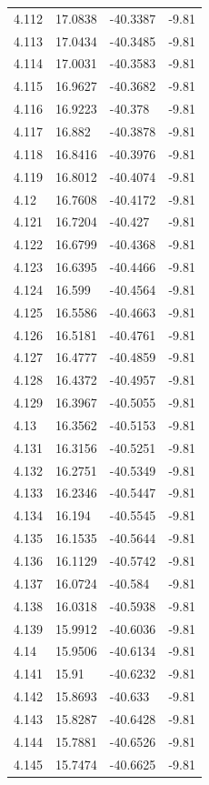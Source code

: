 \begin{tabular}{llll}
4.112 & 17.0838 & -40.3387 & -9.81 \\
4.113 & 17.0434 & -40.3485 & -9.81 \\
4.114 & 17.0031 & -40.3583 & -9.81 \\
4.115 & 16.9627 & -40.3682 & -9.81 \\
4.116 & 16.9223 & -40.378 & -9.81 \\
4.117 & 16.882 & -40.3878 & -9.81 \\
4.118 & 16.8416 & -40.3976 & -9.81 \\
4.119 & 16.8012 & -40.4074 & -9.81 \\
4.12 & 16.7608 & -40.4172 & -9.81 \\
4.121 & 16.7204 & -40.427 & -9.81 \\
4.122 & 16.6799 & -40.4368 & -9.81 \\
4.123 & 16.6395 & -40.4466 & -9.81 \\
4.124 & 16.599 & -40.4564 & -9.81 \\
4.125 & 16.5586 & -40.4663 & -9.81 \\
4.126 & 16.5181 & -40.4761 & -9.81 \\
4.127 & 16.4777 & -40.4859 & -9.81 \\
4.128 & 16.4372 & -40.4957 & -9.81 \\
4.129 & 16.3967 & -40.5055 & -9.81 \\
4.13 & 16.3562 & -40.5153 & -9.81 \\
4.131 & 16.3156 & -40.5251 & -9.81 \\
4.132 & 16.2751 & -40.5349 & -9.81 \\
4.133 & 16.2346 & -40.5447 & -9.81 \\
4.134 & 16.194 & -40.5545 & -9.81 \\
4.135 & 16.1535 & -40.5644 & -9.81 \\
4.136 & 16.1129 & -40.5742 & -9.81 \\
4.137 & 16.0724 & -40.584 & -9.81 \\
4.138 & 16.0318 & -40.5938 & -9.81 \\
4.139 & 15.9912 & -40.6036 & -9.81 \\
4.14 & 15.9506 & -40.6134 & -9.81 \\
4.141 & 15.91 & -40.6232 & -9.81 \\
4.142 & 15.8693 & -40.633 & -9.81 \\
4.143 & 15.8287 & -40.6428 & -9.81 \\
4.144 & 15.7881 & -40.6526 & -9.81 \\
4.145 & 15.7474 & -40.6625 & -9.81 \\

\end{tabular}
